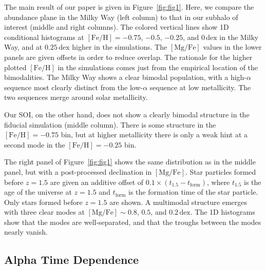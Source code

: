 \documentclass[linenumbers, twocolumn]{aastex631}
\newcommand{\FeH}{\ensuremath{[\textrm{Fe}/\textrm{H}]}}
\newcommand{\MgFe}{\ensuremath{[\textrm{Mg}/\textrm{Fe}]}}
\newcommand{\dex}{\ensuremath{\textrm{dex}}}
\begin{document}
The main result of our paper is given in Figure~\ref{fig:fig1}. Here, we compare the abundance plane in the Milky Way (left column) to that in our subhalo of interest (middle and right columns). The colored vertical lines show 1D conditional histograms at $\FeH=-0.75$, $-0.5$, $-0.25$, and $0\,\dex$ in the Milky Way, and at $0.25\,\dex$ higher in the simulations. The \MgFe{} values in the lower panels are given offsets in order to reduce overlap. The rationale for the higher plotted \FeH{} in the simulations comes just from the empirical location of the bimodalities. The Milky Way shows a clear bimodal population, with a high-$\alpha$ sequence most clearly distinct from the low-$\alpha$ sequence at low metallicity. The two sequences merge around solar metallicity.

Our SOI, on the other hand, does not show a clearly bimodal structure in the fiducial simulation (middle column). There is some structure in the $\FeH=-0.75$ bin, but at higher metallicity there is only a weak hint at a second mode in the $\FeH=-0.25$ bin.

The right panel of Figure~\ref{fig:fig1} shows the same distribution as in the middle panel, but with a post-processed declination in \MgFe{}. Star particles formed before $z=1.5$ are given an additive offset of $0.1\times\left(t_{1.5}-t_{\textrm{form}}\right)$, where $t_{1.5}$ is the age of the universe at $z=1.5$ and $t_{\textrm{form}}$ is the formation time of the star particle. Only stars formed before $z=1.5$ are shown. A multimodal structure emerges with three clear modes at $\MgFe\sim0.8$, $0.5$, and $0.2\,\dex$. The 1D histograms show that the modes are well-separated, and that the troughs between the modes nearly vanish.

\subsection{Alpha Time Dependence}\label{ssec:alpha_time}
\end{document}
